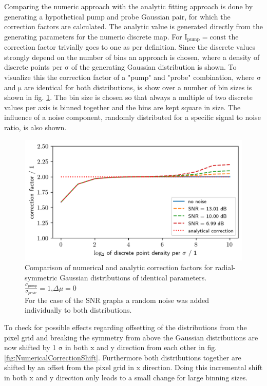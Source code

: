 \documentclass[twoside,openright]{scrreprt}
\begin{document}
Comparing the numeric approach with the analytic fitting approach is done by generating a hypothetical pump and probe Gaussian pair, for which the correction factors are calculated. The analytic value is generated directly from the generating parameters for the numeric discrete map. For $\mathrm{I_{pump} = const}$ the correction factor trivially goes to one as per definition. Since the discrete values strongly depend on the number of bins an approach is chosen, where a density of discrete points per $\mathrm{\sigma}$ of the generating Gaussian distribution is shown. To visualize this the correction factor of a "pump" and "probe" combination, where $\mathrm{\sigma}$ and $\mathrm{\mu}$ are identical for both distributions, is show over a number of bin sizes is shown in fig. \ref{fig:NumericalCorrectionSNR}. The bin size is chosen so that always a multiple of two discrete values per axis is binned together and the bins are kept square in size. The influence of a noise component, randomly distributed for a specific signal to noise ratio, is also shown.

\begin{figure}[h]
\centering
\includegraphics[scale = 1]{images/NumericalCorrectionSNR.png}
\caption{Comparison of numerical and analytic correction factors for radial-symmetric Gaussian distributions of identical parameters. \\$\frac{\sigma_{pump}}{\sigma_{probe}}=1$,$\Delta\mu = 0$\\For the case of the SNR graphs a random noise was added individually to both distributions.\label{fig:NumericalCorrectionSNR}}
\end{figure}

To check for possible effects regarding offsetting of the distributions from the pixel grid and breaking the symmetry from above the Gaussian distributions are now shifted by 1 $\mathrm{\sigma}$ in both x and y direction from each other in fig. \ref{fig:NumericalCorrectionShift}. Furthermore both distributions together are shifted by an offset from the pixel grid in x direction. Doing this incremental shift in both x and y direction only leads to a small change for large binning sizes. 
\end{document}

